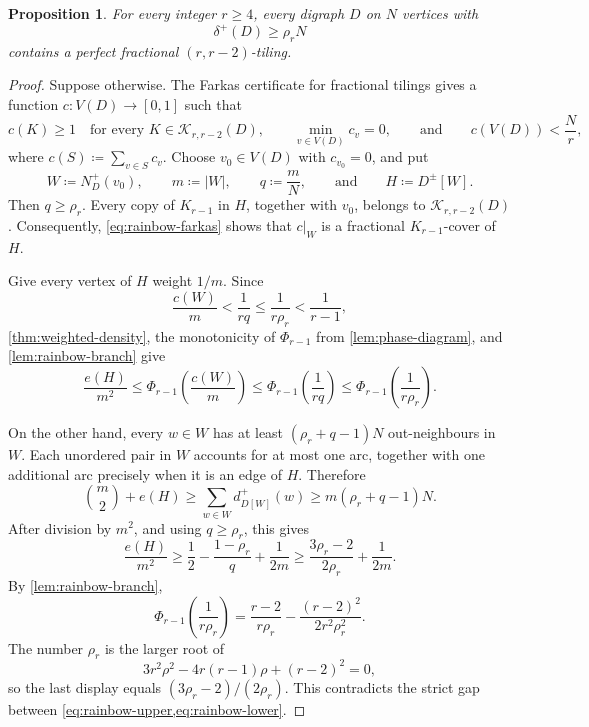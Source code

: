 \documentclass[10pt]{article}
\numberwithin{equation}{section}
\newtheorem{proposition}[proposition]{Proposition}
\begin{document}
\begin{proposition}\label{prop:digraph-fractional}
For every integer $r\ge4$, every digraph $D$ on $N$ vertices with
\[
 \delta^+(D)\ge\rho_rN
\]
contains a perfect fractional $(r,r-2)$-tiling.
\end{proposition}

\begin{proof}
Suppose otherwise.  The Farkas certificate for fractional tilings \cite[Corollary~6.3]{LW24} gives a function $c\colon V(D)\to[0,1]$ such that
\begin{equation}\label{eq:rainbow-farkas}
 c(K)\ge1\quad\text{for every }K\in\mathcal K_{r,r-2}(D),
 \qquad
 \min_{v\in V(D)}c_v=0,
 \qquad\text{and}\qquad
 c(V(D))<\frac Nr,
\end{equation}
where $c(S)\coloneqq\sum_{v\in S}c_v$.  Choose $v_0\in V(D)$ with $c_{v_0}=0$, and put
\[
 W\coloneqq N_D^+(v_0),\qquad m\coloneqq|W|,\qquad q\coloneqq\frac mN,\qquad\text{and}\qquad H\coloneqq D^\pm[W].
\]
Then $q\ge\rho_r$.  Every copy of $K_{r-1}$ in $H$, together with $v_0$, belongs to $\mathcal K_{r,r-2}(D)$.  Consequently, \cref{eq:rainbow-farkas} shows that $c|_W$ is a fractional $K_{r-1}$-cover of $H$.

Give every vertex of $H$ weight $1/m$.  Since
\[
 \frac{c(W)}m<\frac1{rq}\le\frac1{r\rho_r}<\frac1{r-1},
\]
\cref{thm:weighted-density}, the monotonicity of $\Phi_{r-1}$ from \cref{lem:phase-diagram}, and \cref{lem:rainbow-branch} give
\begin{equation}\label{eq:rainbow-upper}
 \frac{e(H)}{m^2}
 \le \Phi_{r-1}\left(\frac{c(W)}m\right)
 \le \Phi_{r-1}\left(\frac1{rq}\right)
 \le \Phi_{r-1}\left(\frac1{r\rho_r}\right).
\end{equation}

On the other hand, every $w\in W$ has at least $(\rho_r+q-1)N$ out-neighbours in $W$.  Each unordered pair in $W$ accounts for at most one arc, together with one additional arc precisely when it is an edge of $H$.  Therefore
\[
 \binom m2+e(H)
 \ge\sum_{w\in W}d^+_{D[W]}(w)
 \ge m(\rho_r+q-1)N.
\]
After division by $m^2$, and using $q\ge\rho_r$, this gives
\begin{equation}\label{eq:rainbow-lower}
 \frac{e(H)}{m^2}
 \ge\frac12-\frac{1-\rho_r}{q}+\frac1{2m}
 \ge\frac{3\rho_r-2}{2\rho_r}+\frac1{2m}.
\end{equation}
By \cref{lem:rainbow-branch},
\[
 \Phi_{r-1}\left(\frac1{r\rho_r}\right)
 =\frac{r-2}{r\rho_r}-\frac{(r-2)^2}{2r^2\rho_r^2}.
\]
The number $\rho_r$ is the larger root of
\begin{equation}\label{eq:rainbow-quadratic}
 3r^2\rho^2-4r(r-1)\rho+(r-2)^2=0,
\end{equation}
so the last display equals $(3\rho_r-2)/(2\rho_r)$.  This contradicts the strict gap between \cref{eq:rainbow-upper,eq:rainbow-lower}.
\end{proof}
\end{document}
